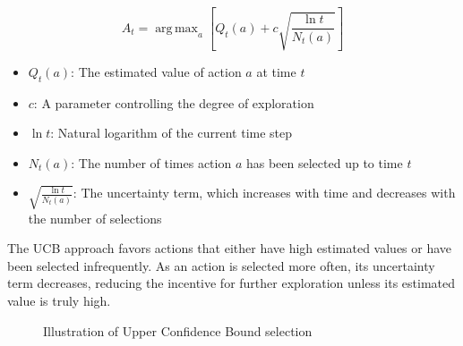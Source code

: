 \documentclass{article}
\DeclareMathOperator*{\argmax}{arg\,max}
\begin{document}
\begin{equation}
    A_t = \argmax_a \left[ Q_t(a) + c \sqrt{\frac{\ln t}{N_t(a)}} \right]
\end{equation}

\begin{tcolorbox}[colback=blue!5!white,colframe=blue!75!black,title=Notation Overview]
\begin{itemize}
    \item $Q_t(a)$: The estimated value of action $a$ at time $t$
    \item $c$: A parameter controlling the degree of exploration
    \item $\ln t$: Natural logarithm of the current time step
    \item $N_t(a)$: The number of times action $a$ has been selected up to time $t$
    \item $\sqrt{\frac{\ln t}{N_t(a)}}$: The uncertainty term, which increases with time and decreases with the number of selections
\end{itemize}
\end{tcolorbox}

The UCB approach favors actions that either have high estimated values or have been selected infrequently. As an action is selected more often, its uncertainty term decreases, reducing the incentive for further exploration unless its estimated value is truly high.

\begin{figure}[h]
\centering
{}
\caption{Illustration of Upper Confidence Bound selection}
\end{figure}
\end{document}
